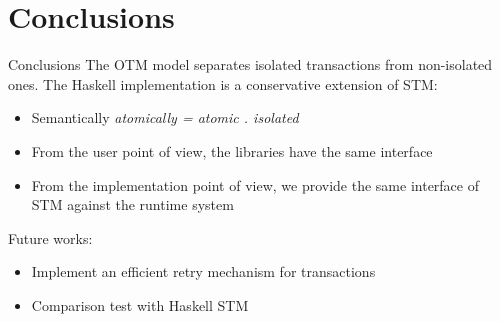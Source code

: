 \documentclass[beamer={noamsthm,10pt},target=bach]{thud}[2014/03/11]
\begin{document}
\section{Conclusions}
\begin{frame}{Conclusions}
The OTM model separates isolated transactions from non-isolated ones.
The Haskell implementation is a conservative extension of STM:
\begin{itemize}
\item Semantically \emph{atomically = atomic . isolated}
\item From the user point of view, the libraries have the same interface
\item From the implementation point of view, we provide the same interface of STM against the runtime system
\end{itemize}
Future works:
\begin{itemize}
\item Implement an efficient retry mechanism for transactions
\item Comparison test with Haskell STM
\end{itemize}
\end{frame}


\end{document}
